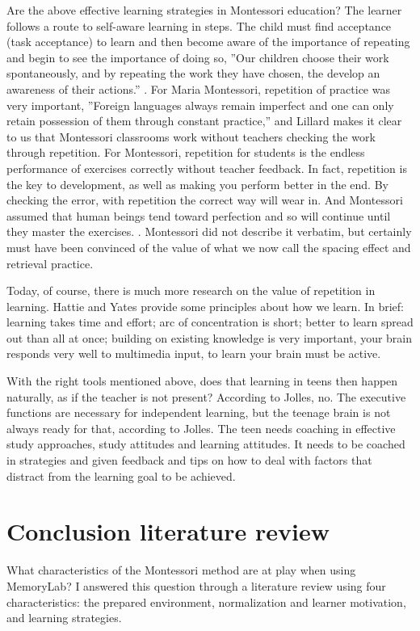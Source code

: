 \documentclass[12pt, a4paper]{article}
\begin{document}
Are the above effective learning strategies in Montessori education? The learner follows a route to self-aware learning in steps. The child must find acceptance (task acceptance) to learn and then become aware of the importance of repeating and begin to see the importance of doing so, ''Our children choose their work spontaneously, and by repeating the work they have chosen, the develop an awareness of their actions.'' \cite[p.47]{Gimbel}. For Maria Montessori, repetition of practice was very important, ''Foreign languages always remain imperfect and one can only retain possession of them through constant practice,'' and Lillard makes it clear to us that Montessori classrooms work without teachers checking the work through repetition. For Montessori, repetition for students is the endless performance of exercises correctly without teacher feedback. In fact, repetition is the key to development, as well as making you perform better in the end. By checking the error, with repetition the correct way will wear in. And Montessori assumed that human beings tend toward perfection and so will continue until they master the exercises. \cite[p.203]{Lillard}. Montessori did not describe it verbatim, but certainly must have been convinced of the value of what we now call the spacing effect and retrieval practice.

Today, of course, there is much more research on the value of repetition in learning. Hattie and Yates provide some principles about how we learn. In brief: learning takes time and effort; arc of concentration is short; better to learn spread out than all at once; building on existing knowledge is very important, your brain responds very well to multimedia input, to learn your brain must be active. \cite[pp. 113-115]{hattie2014}

With the right tools mentioned above, does that learning in teens then happen naturally, as if the teacher is not present? According to Jolles, no. The executive functions are necessary for independent learning, but the teenage brain is not always ready for that, according to Jolles. The teen needs coaching in effective study approaches, study attitudes and learning attitudes. It needs to be coached in strategies and given feedback and tips on how to deal with factors that distract from the learning goal to be achieved.\cite[p.152]{jolles}
\newpage

\section{Conclusion literature review}
What characteristics of the Montessori method are at play when using MemoryLab? I answered this question through a literature review using four characteristics: the prepared environment, normalization and learner motivation, and learning strategies.
\end{document}
